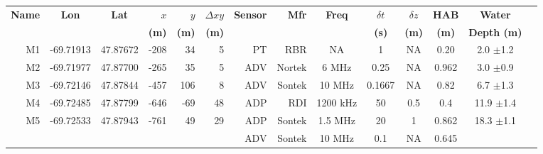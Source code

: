 \documentclass[letterpaper,10pt,landscape]{article}
\begin{document}
\thispagestyle{empty}



\begin{table}
  \label{t:mooring_table}
  \centering
  \begin{tabular}{|r|c|c|r|r|r|r|r|c|c|c|c|c|c|} \hline
    {\bf Name}          & {\bf Lon}                  & {\bf Lat}                 & $x$                    & $y$                  & $\Delta xy$         & {\bf Sensor} &{\bf Mfr}   & {\bf Freq}&$\delta t$ &$\delta z$& {\bf HAB}  & {\bf Water}                        \\
    ~                   &                            &                           & {\bf (m)}              & {\bf (m)}            & {\bf (m)}           &              &            &           & {\bf (s)} & {\bf (m)}& {\bf (m)}  & {\bf Depth (m)}                    \\\hline \hline
    M1                  & -69.71913                  & 47.87672                  & -208                   & 34                   & 5                   & PT           & RBR        & NA        & 1         & NA       & 0.20       &  2.0 $\pm$1.2                      \\\hline
    M2                  & -69.71977                  & 47.87700                  & -265                   & 35                   & 5                   & ADV          & Nortek     & 6 MHz     & 0.25      & NA       & 0.962      &  3.0 $\pm$0.9                      \\\hline %
    M3                  & -69.72146                  & 47.87844                  & -457                   & 106                  & 8                   & ADV          & Sontek     & 10 MHz    & 0.1667    & NA       & 0.82       &  6.7 $\pm$1.3                      \\\hline
    M4                  & -69.72485                  & 47.87799                  & -646                   & -69                  & 48                  & ADP          & RDI        & 1200 kHz  & 50        & 0.5      & 0.4        &  11.9 $\pm$1.4                     \\\hline
    \multirow{4}{*}{M5} & \multirow{4}{*}{-69.72533} & \multirow{4}{*}{47.87943} & \multirow{4}{*}{-761}  & \multirow{4}{*}{49}  & \multirow{4}{*}{29} & ADP          & Sontek     & 1.5 MHz   & 20        & 1        & 0.862      &  \multirow{4}{*}{18.3 $\pm$1.1}    \\ 
    ~                   &                            &                           &                        &                      &                     & ADV          & Sontek     & 10 MHz    & 0.1       & NA       & 0.645      &                                    \\ 

\end{tabular}
\end{table}
\end{document}
